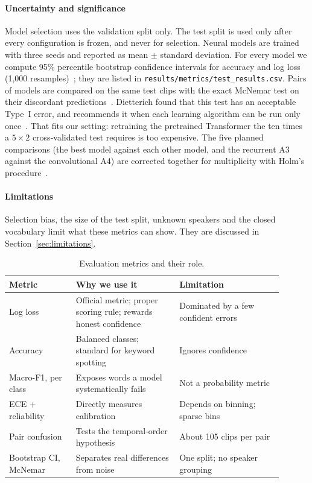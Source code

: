 \paragraph{Uncertainty and significance}
Model selection uses the validation split only. The test split is used only after every configuration is frozen,
and never for selection. Neural models are trained with three seeds and reported as mean $\pm$ standard
deviation. For every model we compute 95\% percentile bootstrap confidence intervals for accuracy and log loss
(1{,}000 resamples)~\cite{efron1993introduction}; they are listed in \texttt{results/metrics/test\_results.csv}. Pairs of models are compared on the same test clips with the exact
McNemar test on their discordant predictions~\cite{mcnemar1947note}. Dietterich found that this test has an
acceptable Type~I error, and recommends it when each learning algorithm can be run only
once~\cite{dietterich1998approximate}. That fits our setting: retraining the pretrained Transformer the ten
times a $5\times2$ cross-validated test requires is too expensive. The five planned comparisons (the best model
against each other model, and the recurrent A3 against the convolutional A4) are corrected together for
multiplicity with Holm's procedure~\cite{holm1979simple}.

\paragraph{Limitations}
Selection bias, the size of the test split, unknown speakers and the closed vocabulary limit what these metrics can show. They are discussed in Section~\ref{sec:limitations}.

\begin{table}[t]
  \centering
  \caption{Evaluation metrics and their role.}
  \label{tab:metrics}
  \small
  \begin{tabular}{@{}p{0.22\linewidth}p{0.34\linewidth}p{0.34\linewidth}@{}}
    \toprule
    Metric & Why we use it & Limitation \\
    \midrule
    Log loss & Official metric; proper scoring rule; rewards honest confidence & Dominated by a few confident errors \\
    Accuracy & Balanced classes; standard for keyword spotting & Ignores confidence \\
    Macro-F1, per class & Exposes words a model systematically fails & Not a probability metric \\
    ECE + reliability & Directly measures calibration & Depends on binning; sparse bins \\
    Pair confusion & Tests the temporal-order hypothesis & About 105 clips per pair \\
    Bootstrap CI, McNemar & Separates real differences from noise & One split; no speaker grouping \\
    \bottomrule
  \end{tabular}
\end{table}

